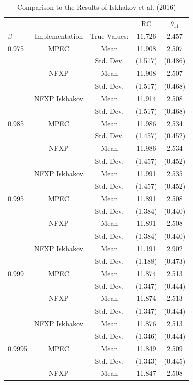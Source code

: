 \begin{table}[H]
	\centering
	\caption{Comparison to the Results of Iskhakov et al. (2016)}
	\begin{tabular}{l c c c c}
		\toprule\midrule
		& & & RC & $\theta_{11}$ \\
		\cmidrule{4-5}
		$\beta$ & Implementation & True Values: & $\mathbf{11.726}$ & $\mathbf{2.457}$ \\ \midrule
		0.975 & MPEC & Mean & 11.908 & 2.507 \\
		& & Std. Dev. & (1.517) & (0.486) \\
		& NFXP & Mean & 11.908 & 2.507 \\
		& & Std. Dev. & (1.517) & (0.468) \\
		& NFXP Iskhakov & Mean & 11.914 & 2.508 \\
		& & Std. Dev. & (1.517) & (0.468) \\ \midrule
		0.985 & MPEC & Mean & 11.986 & 2.534 \\
		& & Std. Dev. & (1.457) & (0.452) \\
		& NFXP & Mean & 11.986 & 2.534 \\
		& & Std. Dev. & (1.457) & (0.452) \\
		& NFXP Iskhakov & Mean & 11.991 & 2.535 \\
		& & Std. Dev. & (1.457) & (0.452) \\ \midrule
		0.995 & MPEC & Mean & 11.891 & 2.508 \\
		& & Std. Dev. & (1.384) & (0.440) \\
		& NFXP & Mean & 11.891 & 2.508 \\
		& & Std. Dev. & (1.384) & (0.440) \\
		& NFXP Iskhakov & Mean & 11.191	& 2.902 \\
		& & Std. Dev. & (1.188) & (0.473) \\ \midrule
		0.999 & MPEC & Mean & 11.874 & 2.513 \\
		& & Std. Dev. & (1.347) & (0.444) \\
		& NFXP & Mean & 11.874 & 2.513 \\
		& & Std. Dev. & (1.347) & (0.444) \\
		& NFXP Iskhakov & Mean & 11.876	& 2.513 \\
		& & Std. Dev. & (1.346) & (0.444) \\ \midrule
		0.9995 & MPEC & Mean & 11.849 & 2.509 \\
		& & Std. Dev. & (1.343) & (0.445) \\
		& NFXP & Mean & 11.847 & 2.508 \\

\end{tabular}
\end{table}
